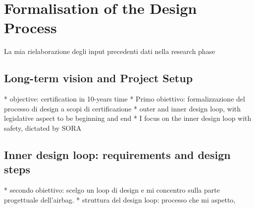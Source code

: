 \chapter{Formalisation of the Design Process}
\label{chapter:design-process}

La mia rielaborazione degli input precedenti dati nella research phase

\section{Long-term vision and Project Setup}
* objective: certification in 10-years time 
* Primo obiettivo: formalizzazione del processo di design a scopi di certificazione
* outer and inner design loop, with legislative aspect to be beginning and end
* I focus on the inner design loop with safety, dictated by SORA



\section{Inner design loop: requirements and design steps}
* secondo obiettivo: scelgo un loop di design e mi concentro sulla parte progettuale dell'airbag. 
* struttura del design loop: processo che mi aspetto,


